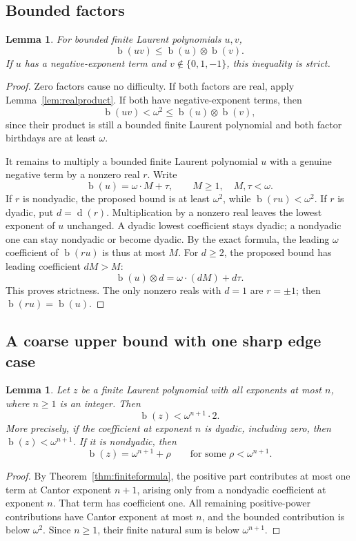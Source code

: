 \documentclass[11pt,letterpaper]{article}
\numberwithin{equation}{section}
\newtheorem{lemma}[theorem]{Lemma}
\theoremstyle{definition}
\theoremstyle{remark}
\newcommand{\bd}{\operatorname{b}}
\newcommand{\rd}{\operatorname{d}}
\newcommand{\np}{\mathbin{\otimes}}
\begin{document}
\subsection{Bounded factors}
\begin{lemma}\label{lem:bounded}
For bounded finite Laurent polynomials $u,v$,
\[
 \bd(uv)\leq\bd(u)\np\bd(v).
\]
If $u$ has a negative-exponent term and $v\notin\{0,1,-1\}$, this inequality
is strict.
\end{lemma}
\begin{proof}
Zero factors cause no difficulty. If both factors are real, apply
Lemma~\ref{lem:realproduct}. If both have negative-exponent terms, then
\[
 \bd(uv)<\omega^2\leq\bd(u)\np\bd(v),
\]
since their product is still a bounded finite Laurent polynomial and both
factor birthdays are at least $\omega$.

It remains to multiply a bounded finite Laurent polynomial $u$ with a genuine
negative term by a nonzero real $r$. Write
\[
 \bd(u)=\omega\cdot M+\tau,\qquad M\geq1,\quad M,\tau<\omega.
\]
If $r$ is nondyadic, the proposed bound is at least $\omega^2$, while
$\bd(ru)<\omega^2$. If $r$ is dyadic, put $d=\rd(r)$. Multiplication by a
nonzero real leaves the lowest exponent of $u$ unchanged. A dyadic lowest
coefficient stays dyadic; a nondyadic one can stay nondyadic or become dyadic.
By the exact formula, the leading $\omega$ coefficient of $\bd(ru)$ is thus at
most $M$. For $d\geq2$, the proposed bound has leading coefficient $dM>M$:
\[
 \bd(u)\np d=\omega\cdot(dM)+d\tau.
\]
This proves strictness. The only nonzero reals with $d=1$ are $r=\pm1$;
then $\bd(ru)=\bd(u)$.
\end{proof}

\subsection{A coarse upper bound with one sharp edge case}
\begin{lemma}\label{lem:degree}
Let $z$ be a finite Laurent polynomial with all exponents at most $n$, where
$n\geq1$ is an integer. Then
\[
 \bd(z)<\omega^{n+1}\cdot2.
\]
More precisely, if the coefficient at exponent $n$ is dyadic, including zero,
then $\bd(z)<\omega^{n+1}$. If it is nondyadic, then
\[
 \bd(z)=\omega^{n+1}+\rho
 \qquad\text{for some }\rho<\omega^{n+1}.
\]
\end{lemma}
\begin{proof}
By Theorem~\ref{thm:finiteformula}, the positive part contributes at most one
term at Cantor exponent $n+1$, arising only from a nondyadic coefficient at
exponent $n$. That term has coefficient one. All remaining positive-power
contributions have Cantor exponent at most $n$, and the bounded contribution
is below $\omega^2$. Since $n\geq1$, their finite natural sum is below
$\omega^{n+1}$.
\end{proof}
\end{document}
